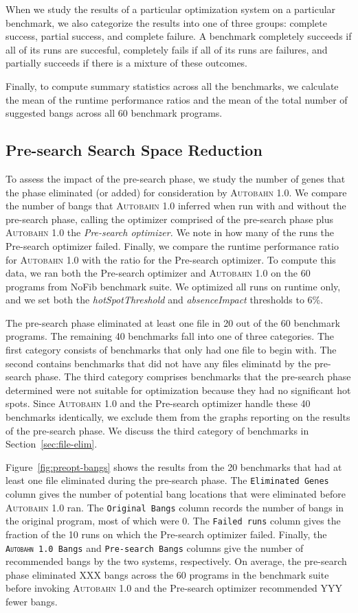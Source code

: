 \documentclass[format=sigplan, review=true]{acmart}
\newcommand{\SHOWCOMMENT}[1]{\ifdraft #1 \fi}
\newcommand{\ksf}[1]{\SHOWCOMMENT{{\color{tuftsblue} [K: #1]}}}
\newcommand{\secref}[1]{Section~\ref{#1}}
\newcommand{\figref}[1]{Figure~\ref{#1}}
\newcommand{\hotspots}[0]{hot spots}
\newcommand{\hotspotcost}[0]{\textit{hotSpotThreshold}}
\newcommand{\Ao}[0]{\textsc{Autobahn 1.0}}
\newcommand{\preopt}[0]{pre-search}
\newcommand{\Preopt}[0]{Pre-search}
\newcommand{\absim}[0]{\textit{absenceImpact}}
\newcommand{\preoptElim}[0]{XXX}
\newcommand{\preoptFewerBangs}[0]{YYY}
\begin{document}
When we study the results of a particular optimization system on a
particular benchmark, we also categorize the results into one of three
groups: complete success, partial success, and complete failure.  A
benchmark completely succeeds if all of its runs are succesful,
completely fails if all of its runs are failures, and partially
succeeds if there is a mixture of these outcomes.

Finally, to compute summary statistics across all the benchmarks, 
we calculate the \ksf{harmonic} mean of the runtime performance ratios
and the \ksf{arithmetic} mean of the total number of suggested bangs
across all 60 benchmark programs. 


\subsection{\Preopt{} Search Space Reduction}

To assess the impact of the \preopt{} phase, we study the number of
genes that the phase eliminated (or added) for consideration by \Ao{}.
We compare the number of bangs that \Ao{} inferred when run with and
without the \preopt{} phase, calling the optimizer comprised of
the \preopt{} phase plus \Ao{} the \textit{\Preopt{} optimizer. } We
note in how many of the runs the \Preopt{} optimizer failed.  Finally,
we compare the runtime performance ratio for \Ao{} with the ratio for
the \Preopt{} optimizer.
To compute this data, we ran both the \Preopt{} optimizer and \Ao{} on
the 60 programs from NoFib benchmark suite.  We optimized all runs 
on runtime only, and we set both the \hotspotcost{} and \absim{} thresholds 
to 6\%.

The \preopt{} phase eliminated at least one file in 20 out of the 60
benchmark programs. 
The remaining 40 benchmarks fall into one of three categories.
The first category consists of benchmarks that only had one file to
begin with. The second contains benchmarks that did not have any files
eliminatd by the \preopt{} phase.  The third category comprises
benchmarks that the \preopt{} phase determined were not suitable for
optimization because they had no significant \hotspots{}. 
Since \Ao{} and the \Preopt{} optimizer handle these 40 benchmarks
identically, we exclude them from the graphs reporting on the results
of the \preopt{} phase. We discuss the third category of benchmarks in 
\secref{sec:file-elim}. \ksf{How many programs were in each
category?}

\figref{fig:preopt-bangs} shows the results from the 20 benchmarks that
had at least one file eliminated during the \preopt{} phase. The
\texttt{Eliminated Genes} column gives the number of potential bang
locations that were eliminated before \Ao{} ran. 
The \texttt{Original Bangs} column records the number of bangs in the
original program, most of which were 0. 
The \texttt{Failed runs} column gives the fraction of the 10 runs on
which the \Preopt{} optimizer failed. 
Finally, the \texttt{\Ao{} Bangs} and \texttt{\Preopt{} Bangs} columns
give the number of recommended bangs by the two systems,
respectively.  On average, the \preopt{} phase eliminated
\preoptElim{} bangs across the 60 programs in the benchmark suite before
invoking \Ao{} and the \Preopt{} optimizer recommended \preoptFewerBangs{} fewer
bangs. 
\end{document}
